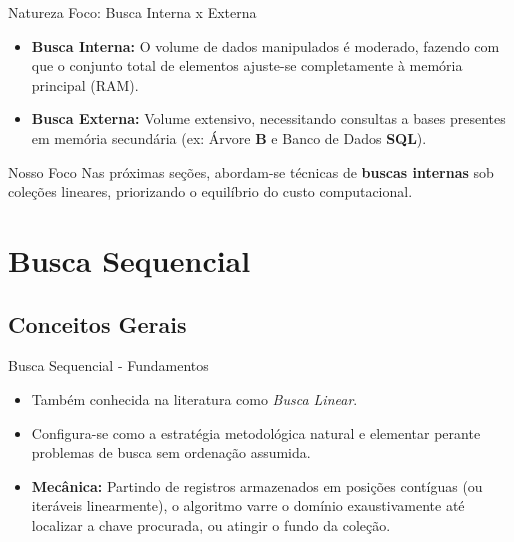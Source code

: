 \documentclass{beamer}
\begin{document}
\begin{frame}{Natureza Foco: Busca Interna x Externa}
\begin{itemize}
    \item \textbf{Busca Interna:} O volume de dados manipulados é moderado, fazendo com que o conjunto total de elementos ajuste-se completamente à memória principal (RAM).
    \item \textbf{Busca Externa:} Volume extensivo, necessitando consultas a bases presentes em memória secundária (ex: Árvore \textbf{B} e Banco de Dados \textbf{SQL}).
\end{itemize}
\pause
\vspace{0.3cm}
\begin{block}{Nosso Foco}
Nas próximas seções, abordam-se técnicas de \textbf{buscas internas} sob coleções lineares, priorizando o equilíbrio do custo computacional.
\end{block}
\end{frame}

\section{Busca Sequencial}
\subsection{Conceitos Gerais}

\begin{frame}{Busca Sequencial - Fundamentos}
\begin{itemize}
    \item Também conhecida na literatura como \textit{Busca Linear}.
    \item Configura-se como a estratégia metodológica natural e elementar perante problemas de busca sem ordenação assumida.
    \item \textbf{Mecânica:} Partindo de registros armazenados em posições contíguas (ou iteráveis linearmente), o algoritmo varre o domínio exaustivamente até localizar a chave procurada, ou atingir o fundo da coleção.
\end{itemize}
\end{frame}
\end{document}
